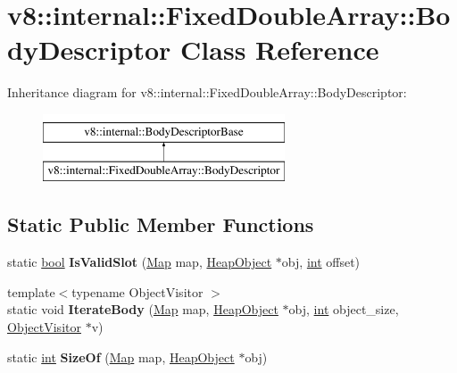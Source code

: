 \hypertarget{classv8_1_1internal_1_1FixedDoubleArray_1_1BodyDescriptor}{}\section{v8\+:\+:internal\+:\+:Fixed\+Double\+Array\+:\+:Body\+Descriptor Class Reference}
\label{classv8_1_1internal_1_1FixedDoubleArray_1_1BodyDescriptor}
Inheritance diagram for v8\+:\+:internal\+:\+:Fixed\+Double\+Array\+:\+:Body\+Descriptor\+:\begin{figure}[H]
\begin{center}
\leavevmode
\includegraphics[height=2.000000cm]{classv8_1_1internal_1_1FixedDoubleArray_1_1BodyDescriptor}
\end{center}
\end{figure}
\subsection*{Static Public Member Functions}
\begin{DoxyCompactItemize}
\item 
\mbox{\label{classv8_1_1internal_1_1FixedDoubleArray_1_1BodyDescriptor_a2e3f7f6983a6ce4791bef45d1872faeb}} 
static \mbox{\hyperlink{classbool}{bool}} {\bfseries Is\+Valid\+Slot} (\mbox{\hyperlink{classv8_1_1internal_1_1Map}{Map}} map, \mbox{\hyperlink{classv8_1_1internal_1_1HeapObject}{Heap\+Object}} $\ast$obj, \mbox{\hyperlink{classint}{int}} offset)
\item 
\mbox{\label{classv8_1_1internal_1_1FixedDoubleArray_1_1BodyDescriptor_a4b2968d756b6ba48afff4a64f0cb801b}} 
{\footnotesize template$<$typename Object\+Visitor $>$ }\\static void {\bfseries Iterate\+Body} (\mbox{\hyperlink{classv8_1_1internal_1_1Map}{Map}} map, \mbox{\hyperlink{classv8_1_1internal_1_1HeapObject}{Heap\+Object}} $\ast$obj, \mbox{\hyperlink{classint}{int}} object\+\_\+size, \mbox{\hyperlink{classv8_1_1internal_1_1ObjectVisitor}{Object\+Visitor}} $\ast$v)
\item 
\mbox{\label{classv8_1_1internal_1_1FixedDoubleArray_1_1BodyDescriptor_a22577093cb8e4d6f8e895bdcecd7d06c}} 
static \mbox{\hyperlink{classint}{int}} {\bfseries Size\+Of} (\mbox{\hyperlink{classv8_1_1internal_1_1Map}{Map}} map, \mbox{\hyperlink{classv8_1_1internal_1_1HeapObject}{Heap\+Object}} $\ast$obj)
\end{DoxyCompactItemize}
